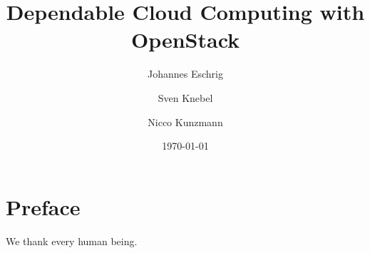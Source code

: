 \documentclass[%
  english,%
  trtype=proceedings%
]{hpitr}
\title{Dependable Cloud Computing with OpenStack}
\author{Johannes Eschrig\and Sven Knebel\and Nicco Kunzmann}
\date{\today}
\begin{document}
\maketitle
\frontmatter
\chapter*{Preface}

We thank every human being.

\tableofcontents
\mainmatter
{}
\end{document}
